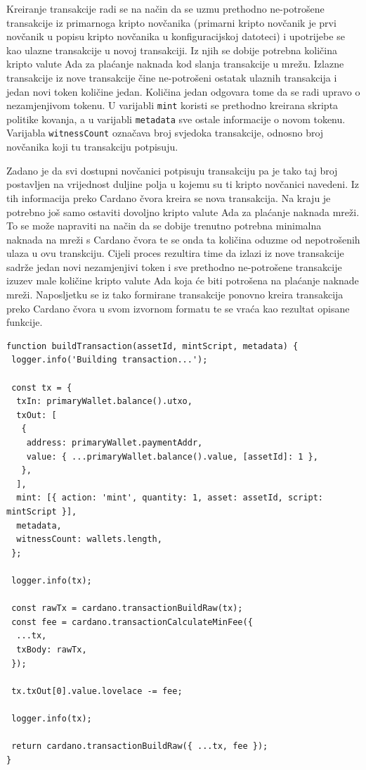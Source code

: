 \documentclass[times, utf8, diplomski]{fer}
\begin{document}
Kreiranje transakcije radi se na način da se uzmu prethodno ne-potrošene transakcije iz primarnoga kripto novčanika (primarni kripto novčanik je prvi novčanik u popisu kripto novčanika u konfiguracijskoj datoteci) i upotrijebe se kao ulazne transakcije u novoj transakciji. Iz njih se dobije potrebna količina kripto valute Ada za plaćanje naknada kod slanja transakcije u mrežu. Izlazne transakcije iz nove transakcije čine ne-potrošeni ostatak ulaznih transakcija i jedan novi token količine jedan. Količina jedan odgovara tome da se radi upravo o nezamjenjivom tokenu. U varijabli \texttt{mint} koristi se prethodno kreirana skripta politike kovanja, a u varijabli \texttt{metadata} sve ostale informacije o novom tokenu. Varijabla \texttt{witnessCount} označava broj svjedoka transakcije, odnosno broj novčanika koji tu transakciju potpisuju.

Zadano je da svi dostupni novčanici potpisuju transakciju pa je tako taj broj postavljen na vrijednost duljine polja u kojemu su ti kripto novčanici navedeni. Iz tih informacija preko Cardano čvora kreira se nova transakcija. Na kraju je potrebno još samo ostaviti dovoljno kripto valute Ada za plaćanje naknada mreži. To se može napraviti na način da se dobije trenutno potrebna minimalna naknada na mreži s Cardano čvora te se onda ta količina oduzme od nepotrošenih ulaza u ovu transkciju. Cijeli proces rezultira time da izlazi iz nove transakcije sadrže jedan novi nezamjenjivi token i sve prethodno ne-potrošene transakcije izuzev male količine kripto valute Ada koja će biti potrošena na plaćanje naknade mreži. Naposljetku se iz tako formirane transakcije ponovno kreira transakcija preko Cardano čvora u svom izvornom formatu te se vraća kao rezultat opisane funkcije.

\begin{lstlisting}
function buildTransaction(assetId, mintScript, metadata) {
 logger.info('Building transaction...');

 const tx = {
  txIn: primaryWallet.balance().utxo,
  txOut: [
   {
    address: primaryWallet.paymentAddr,
    value: { ...primaryWallet.balance().value, [assetId]: 1 },
   },
  ],
  mint: [{ action: 'mint', quantity: 1, asset: assetId, script: mintScript }],
  metadata,
  witnessCount: wallets.length,
 };

 logger.info(tx);

 const rawTx = cardano.transactionBuildRaw(tx);
 const fee = cardano.transactionCalculateMinFee({
  ...tx,
  txBody: rawTx,
 });

 tx.txOut[0].value.lovelace -= fee;

 logger.info(tx);

 return cardano.transactionBuildRaw({ ...tx, fee });
}
\end{lstlisting}
\end{document}
